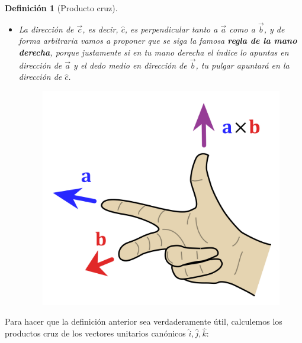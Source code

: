 \documentclass[12pt, fleqn]{report}                             %
\newtheorem{Definition}{Definición}[section]                    %
\theoremstyle{break}                                            %
\begin{document}
\begin{Definition}[Producto cruz]
\begin{itemize}
                    \item La dirección de $\vec{c}$, es decir, $\hat{c}$, es perpendicular tanto a $\vec{a}$ como a $\vec{b}$, y de forma arbitraria vamos a proponer que se siga la famosa \textbf{regla de la mano derecha}, porque justamente si en tu mano derecha el índice lo apuntas en dirección de $\vec{a}$ y el dedo medio en dirección de $\vec{b}$, tu pulgar apuntará en la dirección de $\hat{c}$.
                    \begin{figure}[H]
                        \centering
                        \includegraphics[scale=0.2]{rightHandRule.png}
                    \end{figure}
                \end{itemize}
            \end{Definition}
        
            Para hacer que la definición anterior sea verdaderamente útil, calculemos los productos cruz de los vectores unitarios canónicos $\hat{i}, \hat{j}, \hat{k}$:
            
\end{document}
